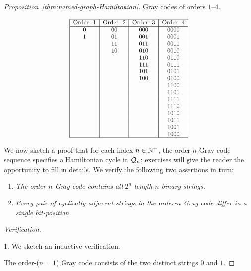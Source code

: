 \begin{proof}[Proposition~\ref{thm:named-graph-Hamiltonian}]
\begin{table}
\caption{Gray codes of orders $1$--$4$.}
\label{tab:gray-code}
\begin{equation}
 {\small
\begin{array}{|c|c|c|c|}
\hline
\mbox{Order } \ 1
  & \mbox{Order } \ 2
  & \mbox{Order } \ 3
  & \mbox{Order } \ 4 \\
\hline
0   & 00   & 000  &  0000 \\ 
1   & 01   & 001  &  0001 \\
    & 11   & 011  &  0011 \\
    & 10   & 010  &  0010 \\
    &      & 110  &  0110 \\
    &      & 111  &  0111 \\
    &      & 101  &  0101 \\
    &      & 100  &  0100 \\
    &      &      &  1100 \\  
    &      &      &  1101 \\  
    &      &      &  1111 \\  
    &      &      &  1110 \\  
    &      &      &  1010 \\  
    &      &      &  1011 \\  
    &      &      &  1001 \\  
    &      &      &  1000 \\  
\hline
\end{array} }
\end{equation}
\end{table}

We now sketch a proof that for each index $n \in \mathbb{N}^+$, the order-$n$ Gray code sequence specifies a Hamiltonian cycle in $\mbox{$\cal Q$}_n$; exercises will give the reader the opportunity to fill in details.  We verify the following two assertions in turn:
\begin{enumerate}
\item
{\it The order-$n$ Gray code contains all $2^n$ length-$n$ binary strings.}
\medskip\item
{\it Every pair of cyclically adjacent strings in the order-$n$ Gray code differ in a single bit-position.}
\end{enumerate}
{\it Verification}.

 1.
We sketch an inductive verification.

The order-($n=1$) Gray code consists of the two distinct strings $0$ and $1$.


\end{proof}
